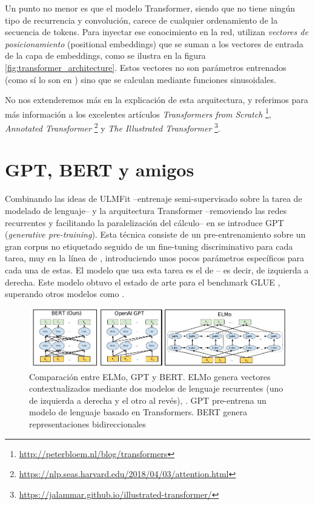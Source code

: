 Un punto no menor es que el modelo Transformer, siendo que no tiene ningún tipo de recurrencia y convolución, carece de cualquier ordenamiento de la secuencia de tokens. Para inyectar ese conocimiento en la red, utilizan \emph{vectores de posicionamiento} (positional embeddings) que se suman a los vectores de entrada de la capa de embeddings, como se ilustra en la figura \ref{fig:transformer_architecture}. Estos vectores no son parámetros entrenados (como sí lo son en \bert{}) sino que se calculan mediante funciones sinusoidales.


No nos extenderemos más en la explicación de esta arquitectura, y referimos para más información a los excelentes artículos \emph{Transformers from Scratch} \footnote{\url{http://peterbloem.nl/blog/transformers}}, \emph{Annotated Transformer} \footnote{\url{https://nlp.seas.harvard.edu/2018/04/03/attention.html}} y \emph{The Illustrated Transformer} \footnote{\url{https://jalammar.github.io/illustrated-transformer/}}.


\section{GPT, BERT y amigos}

\label{sec:02_bert}

Combinando las ideas de ULMFit --entrenaje semi-supervisado sobre la tarea de modelado de lenguaje-- y la arquitectura Transformer --removiendo las redes recurrentes y facilitando la paralelización del cálculo-- en \citet{radford2018improving} se introduce GPT (\emph{generative pre-training}). Esta técnica consiste de un pre-entrenamiento sobre un gran corpus no etiquetado seguido de un fine-tuning discriminativo para cada tarea, muy en la línea de \citet{howard-ruder-2018-universal}, introduciendo unos pocos parámetros específicos para cada una de estas. El modelo que usa esta tarea es el de  -- es decir, de izquierda a derecha. Este modelo obtuvo el estado de arte para el benchmark GLUE \cite{wang-etal-2018-glue}, superando otros modelos como \elmo{}.


\begin{figure}[t]
    \centering
    \includegraphics[width=\textwidth]{img/02/gpt_vs_bert.pdf}
    \caption{Comparación entre ELMo, GPT y BERT. ELMo genera vectores contextualizados mediante dos modelos de lenguaje recurrentes (uno de izquierda a derecha y el otro al revés), . GPT pre-entrena un modelo de lenguaje basado en Transformers. BERT genera representaciones bidireccionales }
    \label{fig:gpt_vs_bert_vs_elmo}
\end{figure}



